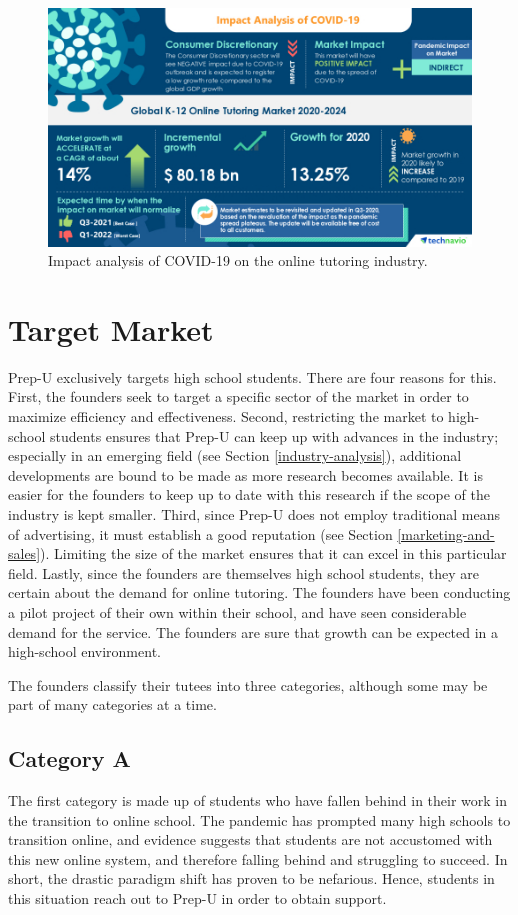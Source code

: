 \documentclass{business}
\begin{document}
    \begin{figure}[H]
        \centering
        \caption{Impact analysis of COVID-19 on the online tutoring industry. \cite{K-12-2020}}
        \includegraphics[scale=0.8]{images/infographic-2.jpg}
    \end{figure}
    \section{Target Market}\label{target-market}
    Prep-U exclusively targets high school students. There are four reasons for this. First, the founders seek to target a specific sector of the market  in order to maximize efficiency and effectiveness. Second, restricting the market to high-school students ensures that Prep-U can keep up with advances in the industry; especially in an emerging field (see Section \ref{industry-analysis}), additional developments are bound to be made as more research becomes available. It is easier for the founders to keep up to date with this research if the scope of the industry is kept smaller. Third, since Prep-U does not employ traditional means of advertising, it must establish a good reputation (see Section \ref{marketing-and-sales}). Limiting the size of the market ensures that it can excel in this particular field. Lastly, since the founders are themselves high school students, they are certain about the demand for online tutoring. The founders have been conducting a pilot project of their own within their school, and have seen considerable demand for the service. The founders are sure that growth can be expected in a high-school environment.\par
    The founders classify their tutees into three categories, although some may be part of many categories at a time. 
    \subsection{Category A}
    The first category is made up of students who have fallen behind in their work in the transition to online school. The pandemic has prompted many high schools to transition online, and evidence suggests that students are not accustomed with this new online system, and therefore falling behind and struggling to succeed. In short, the drastic paradigm shift has proven to be nefarious. Hence, students in this situation reach out to Prep-U in order to obtain support. 
\end{document}
